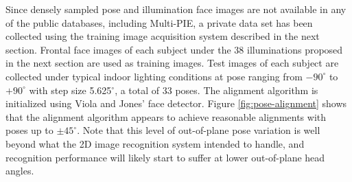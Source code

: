  Since densely sampled pose and
    illumination face images are not available in any of
    the public databases, including Multi-PIE, a private
	data set has been collected using the training image
	acquisition system described in the next section.
	Frontal face images of each subject under the 38 illuminations proposed
    in the next section are used as training images. Test
	images of each subject are collected under typical indoor
    lighting conditions at pose ranging from $-90^\circ$ to
    $+90^\circ$ with step size 5.625$^\circ$, a total of 33
    poses. The alignment algorithm is initialized using 
	Viola and Jones' face detector.
	Figure \ref{fig:pose-alignment} shows that the alignment algorithm 
	appears to achieve reasonable alignments
	with poses up to $\pm 45^\circ$.
Note that this level of out-of-plane
 pose variation is well beyond what the 2D image recognition system
intended to handle, and recognition performance will likely start
to suffer at lower out-of-plane head angles.
